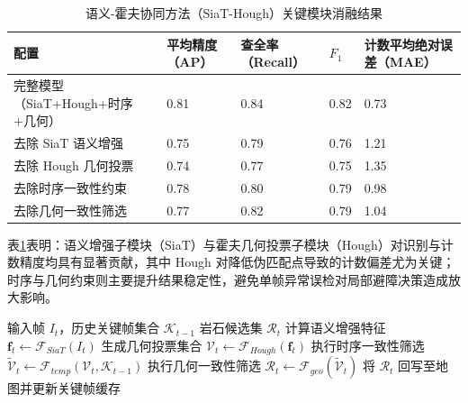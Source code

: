 \documentclass[UTF8,zihao=-4,a4paper,oneside,openany]{ctexrep}
\numberwithin{equation}{chapter}
\renewcommand{\small}{\normalsize}
\renewcommand{\small}{\normalsize}
\theoremstyle{plain}
\theoremstyle{definition}
\begin{document}
\begin{table}[H]
	\centering
	\small
	\caption{语义-霍夫协同方法（SiaT-Hough）关键模块消融结果}
	\label{tab:ch5_ablation}
	\begin{tabular}{p{}p{}p{}p{}p{}}
		\toprule
		配置 & 平均精度（AP） & 查全率（Recall） & $F_1$ & 计数平均绝对误差（MAE） \\
		\midrule
		完整模型（SiaT+Hough+时序+几何） & 0.81 & 0.84 & 0.82 & 0.73 \\
		去除 SiaT 语义增强 & 0.75 & 0.79 & 0.76 & 1.21 \\
		去除 Hough 几何投票 & 0.74 & 0.77 & 0.75 & 1.35 \\
		去除时序一致性约束 & 0.78 & 0.80 & 0.79 & 0.98 \\
		去除几何一致性筛选 & 0.77 & 0.82 & 0.79 & 1.04 \\
		\bottomrule
	\end{tabular}
\end{table}

表\ref{tab:ch5_ablation}表明：语义增强子模块（SiaT）与霍夫几何投票子模块（Hough）对识别与计数精度均具有显著贡献，其中 Hough 对降低伪匹配点导致的计数偏差尤为关键；时序与几何约束则主要提升结果稳定性，避免单帧异常误检对局部避障决策造成放大影响。

\begin{algorithm}[H]
	\caption{语义-霍夫协同前端融合伪代码（SiaT-Hough）}
	\label{alg:ch5_siathough_fusion}
	\begin{algorithmic}[1]
		\REQUIRE 输入帧 $I_t$，历史关键帧集合 $\mathcal{K}_{t-1}$
		\ENSURE 岩石候选集 $\mathcal{R}_t$
		\STATE 计算语义增强特征 $\mathbf{f}_t\leftarrow \mathcal{F}_{SiaT}(I_t)$
		\STATE 生成几何投票集合 $\mathcal{V}_t\leftarrow \mathcal{F}_{Hough}(\mathbf{f}_t)$
		\STATE 执行时序一致性筛选 $\tilde{\mathcal{V}}_t\leftarrow \mathcal{F}_{temp}(\mathcal{V}_t,\mathcal{K}_{t-1})$
		\STATE 执行几何一致性筛选 $\mathcal{R}_t\leftarrow \mathcal{F}_{geo}(\tilde{\mathcal{V}}_t)$
		\STATE 将 $\mathcal{R}_t$ 回写至地图并更新关键帧缓存
	\end{algorithmic}
\end{algorithm}
\end{document}
